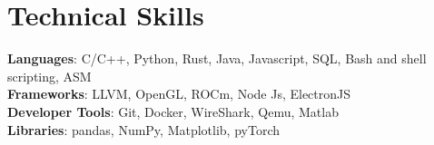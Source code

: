 \documentclass[letterpaper,11pt]{article}
\begin{document}
\section{Technical Skills}
 \begin{itemize}[leftmargin=0.15in, label={}]
    \small{\item{
     \textbf{Languages}{: C/C++, Python, Rust, Java, Javascript, SQL, Bash and shell scripting, ASM} \\
     \textbf{Frameworks}{: LLVM, OpenGL, ROCm, Node Js,  ElectronJS} \\
     \textbf{Developer Tools}{: Git, Docker, WireShark, Qemu, Matlab} \\
      \textbf{Libraries}{: pandas, NumPy, Matplotlib, pyTorch}
    }}
 \end{itemize}


\end{document}
